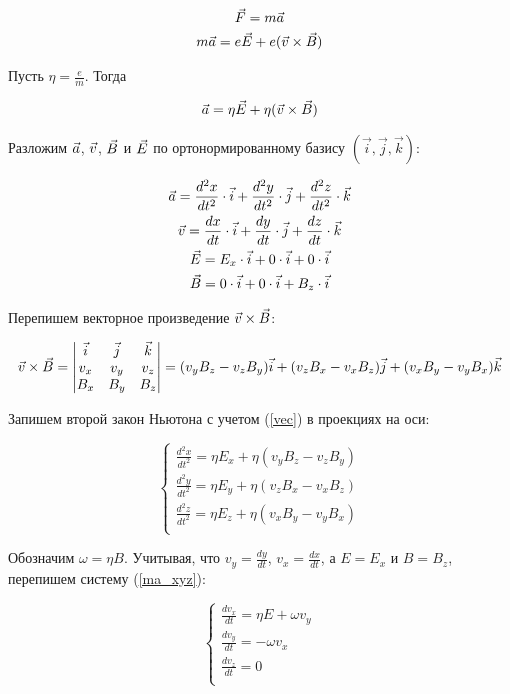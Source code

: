 \begin{gather}
	\vec{F}=m\vec{a}\\
	m\vec{a}=e\vec{E}+e(\vec{v}\times\vec{B})
\end{gather}

Пусть $\eta=\frac{e}{m}$. Тогда

\begin{gather}
	\vec{a}=\eta\vec{E}+\eta(\vec{v}\times\vec{B})
\end{gather}

Разложим $\vec{a}$, $\vec{v}$, $\vec{B}$ и $\vec{E}$ по ортонормированному базису $(\vec{i},\vec{j},\vec{k})$:

\begin{gather}
	\vec{a}=\frac{d^2x}{dt^2}\cdot\vec{i}+\frac{d^2y}{dt^2}\cdot\vec{j}+\frac{d^2z}{dt^2}\cdot\vec{k}\\
	\vec{v}=\frac{dx}{dt}\cdot\vec{i}+\frac{dy}{dt}\cdot\vec{j}+\frac{dz}{dt}\cdot\vec{k}\\
	\vec{E}=E_x\cdot\vec{i}+0\cdot\vec{i}+0\cdot\vec{i}\\
	\vec{B}=0\cdot\vec{i}+0\cdot\vec{i}+B_z\cdot\vec{i}
\end{gather}

Перепишем векторное произведение $\vec{v}\times\vec{B}$:

\begin{gather}
	\label{vec}
	\vec{v}\times\vec{B} = \begin{vmatrix} \vec{i} & \vec{j} & \vec{k} \\ v_x & v_y & v_z \\ B_x & B_y & B_z \end{vmatrix}=(v_yB_z-v_zB_y)\vec{i}+(v_zB_x-v_xB_z)\vec{j}+(v_xB_y-v_yB_x)\vec{k}
\end{gather}

Запишем второй закон Ньютона с учетом (\ref{vec}) в проекциях на оси:

\begin{equation}
\label{ma_xyz}
 \begin{cases}
   \frac{d^2x}{dt^2}=\eta{}E_x+\eta(v_yB_z-v_zB_y)\\
   \frac{d^2y}{dt^2}=\eta{}E_y+\eta(v_zB_x-v_xB_z)\\
   \frac{d^2z}{dt^2}=\eta{}E_z+\eta(v_xB_y-v_yB_x)\\
 \end{cases}
\end{equation}

Обозначим $\omega=\eta{B}$. Учитывая, что $v_y=\frac{dy}{dt}$, $v_x=\frac{dx}{dt}$,  а $E=E_x$ и $B=B_z$, перепишем систему (\ref{ma_xyz}):

\begin{equation}
\label{dv}
 \begin{cases}
   \frac{dv_x}{dt}=\eta{}E+\omega{}v_y\\
   \frac{dv_y}{dt}=-\omega{}v_x\\
   \frac{dv_z}{dt}=0\\
 \end{cases}
\end{equation}

